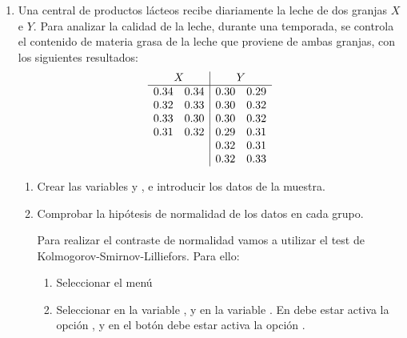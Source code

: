 \begin{description}
\begin{enumerate}[leftmargin=*]
\begin{enumerate}
\end{enumerate}

\item  Una central de productos lácteos recibe diariamente la
leche de dos granjas $X$ e $Y$. Para analizar la
calidad de la leche, durante una temporada, se controla el
contenido de materia grasa de la leche que proviene de ambas
granjas, con los siguientes resultados:
\[
\begin{array}{ll|ll}
\multicolumn{2}{c|}{X} & \multicolumn{2}{c}{Y} \\
\hline
0.34 & 0.34 & 0.30 & 0.29 \\
0.32 & 0.33 & 0.30 & 0.32 \\
0.33 & 0.30 & 0.30 & 0.32 \\
0.31 & 0.32 & 0.29 & 0.31 \\
 &  & 0.32 & 0.31 \\
 &  & 0.32 & 0.33 \\
\end{array}
\]


\begin{enumerate}
\item Crear las variables  y , e
 introducir los datos de la muestra.

\item Comprobar la hipótesis de normalidad de los datos en cada grupo.
\begin{indicacion}
Para realizar el contraste de normalidad vamos a utilizar el test de Kolmogorov-Smirnov-Lilliefors. Para ello:
\begin{enumerate}
\item Seleccionar el menú 
\item Seleccionar en  la variable , y en  la variable . En  debe estar activa la opción , y en el botón  debe estar activa la opción .
\end{enumerate}
\end{indicacion}


\end{enumerate}
\end{enumerate}
\end{description}
